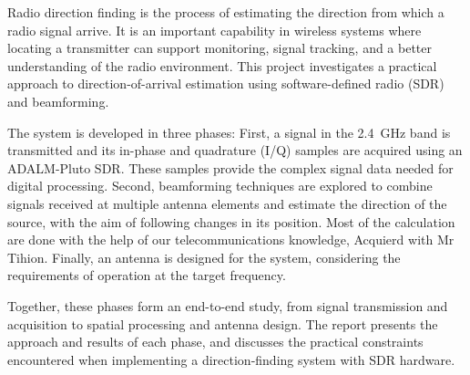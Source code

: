 \noindent
Radio direction finding is the process of estimating the direction from which a
radio signal arrive. It is an important capability in wireless systems where
locating a transmitter can support monitoring, signal tracking, and a better
understanding of the radio environment. 
\newline
This project investigates a practical
approach to direction-of-arrival estimation using software-defined radio (SDR)
and beamforming.

\medskip
\noindent
The system is developed in three phases: 
\newline
\newline
First, a signal in the 2.4~GHz band is
transmitted and its in-phase and quadrature (I/Q) samples are acquired using an
ADALM-Pluto SDR. These samples provide the complex signal data needed for
digital processing. 
\newline
\newline
Second, beamforming techniques are explored to combine
signals received at multiple antenna elements and estimate the direction of
the source, with the aim of following changes in its position. Most of the calculation are done with
the help of our telecommunications knowledge, Acquierd with Mr Tihion.
\newline
\newline
Finally, an
antenna is designed for the system, considering the requirements of operation
at the target frequency.

\medskip
\noindent
Together, these phases form an end-to-end study, from signal transmission and
acquisition to spatial processing and antenna design. The report presents the
approach and results of each phase, and discusses the practical constraints
encountered when implementing a direction-finding system with SDR hardware.